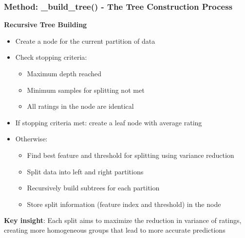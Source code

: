 \documentclass{beamer}
\begin{document}
\begin{frame}
\frametitle{Method: \_build\_tree() - The Tree Construction Process}
    \textbf{Recursive Tree Building}
    \begin{itemize}
        \item Create a node for the current partition of data
        \item Check stopping criteria:
        \begin{itemize}
            \item Maximum depth reached
            \item Minimum samples for splitting not met
            \item All ratings in the node are identical
        \end{itemize}
        \item If stopping criteria met: create a leaf node with average rating
        \item Otherwise:
        \begin{itemize}
            \item Find best feature and threshold for splitting using variance reduction
            \item Split data into left and right partitions
            \item Recursively build subtrees for each partition
            \item Store split information (feature index and threshold) in the node
        \end{itemize}
    \end{itemize}
    
    \textbf{Key insight}: Each split aims to maximize the reduction in variance of ratings, creating more homogeneous groups that lead to more accurate predictions
\end{frame}
\end{document}
